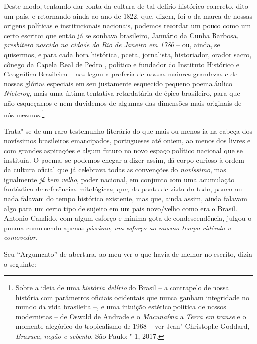 Deste modo, tentando dar conta da cultura de tal delírio histórico
concreto, dito um país, e retornando ainda ao ano de 1822, que, dizem,
foi o da marca de nossas origens políticas e institucionais nacionais,
podemos recordar um pouco como um certo escritor que então já se sonhava
brasileiro, Januário da Cunha Barbosa, \emph{presbítero nascido na
cidade do Rio de Janeiro em 1780} -- ou, ainda, se quisermos, e para
cada hora histórica, poeta, jornalista, historiador, orador sacro,
cônego da Capela Real de Pedro , político e fundador do Instituto
Histórico e Geográfico Brasileiro -- nos legou a profecia de nossas
maiores grandezas e de nossas glórias especiais em seu justamente
esquecido pequeno poema áulico \emph{Nicteroy}, mais uma última
tentativa retardatária de épico brasileiro, para que não esqueçamos e
nem duvidemos de algumas das dimensões mais originais de nós
mesmos.\footnote{Sobre a ideia de uma \emph{história delírio} do Brasil
  -- a contrapelo de nossa história com parâmetros oficiais ocidentais
  que nunca ganham integridade no mundo da vida brasileira --, e uma
  intuição estético política de nossos modernistas -- de Oswald de
  Andrade e o \emph{Macunaíma} a \emph{Terra em transe} e o momento
  alegórico do tropicalismo de 1968 -- ver Jean"-Christophe Goddard,
  \emph{Brazuca, negão e sebento}, São Paulo: "-1, 2017.}

Trata"-se de um raro testemunho literário do que mais ou menos ia na
cabeça dos novíssimos brasileiros emancipados, portugueses até ontem, ao
menos dos livres e com grandes aspirações e algum futuro no novo espaço
político nacional que se instituía. O poema, se podemos chegar a dizer
assim, dá corpo curioso à ordem da cultura oficial que já celebrava
todas as convenções do \emph{novíssimo}, mas igualmente \emph{já bem
velho}, poder nacional, em conjunto com uma acumulação fantástica de
referências mitológicas, que, do ponto de vista do todo, pouco ou nada
falavam do tempo histórico existente, mas que, ainda assim, ainda
falavam algo para um certo tipo de sujeito em um pais novo/velho como
era o Brasil. Antonio Candido, com algum esforço e mínima gota de
condescendência, julgou o poema como sendo apenas \emph{péssimo},
\emph{um esforço ao mesmo tempo ridículo e comovedor}.

Seu ``Argumento'' de abertura, ao meu ver o que havia de melhor no
escrito, dizia o seguinte:

